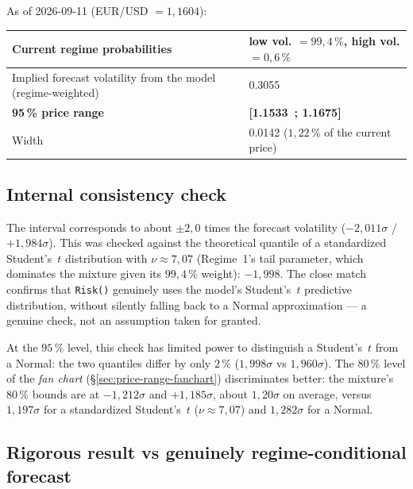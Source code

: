 \documentclass[12pt,a4paper]{article}
\begin{document}
As of 2026-09-11 (EUR/USD $=1{,}1604$):

\vspace{0.3cm}

\begin{center}
	\begin{tabular}{|p{6.7cm}|p{6.7cm}|}
		\hline
		Current regime probabilities & low vol. $=99{,}4\,\%$, high vol. $=0{,}6\,\%$ \\
		\hline
		Implied forecast volatility from the model (regime-weighted) & 0.3055 \\
		\hline
		\textbf{95\,\% price range} & \textbf{[1.1533~; 1.1675]} \\
		\hline
		Width & 0.0142 ($1{,}22\,\%$ of the current price) \\
		\hline
	\end{tabular}
\end{center}

\vspace{0.3cm}

\subsection{Internal consistency check}
\label{sec:price-range-internal-check}

The interval corresponds to about $\pm 2{,}0$ times the
forecast volatility ($-2{,}011\sigma$ / $+1{,}984\sigma$). This was checked against
the theoretical quantile of a standardized Student's~$t$
distribution with $\nu \approx 7{,}07$ (Regime~1's tail
parameter, which dominates the mixture given its $99{,}4\,\%$
weight): $-1{,}998$. The close match confirms that
\texttt{Risk()} genuinely uses the model's Student's~$t$
predictive distribution, without silently falling back to a
Normal approximation --- a genuine check, not an
assumption taken for granted.

At the $95\,\%$ level, this check has limited power to
distinguish a Student's~$t$ from a Normal: the two quantiles
differ by only $2\,\%$ ($1{,}998\sigma$ vs $1{,}960\sigma$). The
$80\,\%$ level of the \emph{fan chart} (\S\ref{sec:price-range-fanchart})
discriminates better: the mixture's $80\,\%$ bounds are at
$-1{,}212\sigma$ and $+1{,}185\sigma$, about $1{,}20\sigma$ on
average, versus $1{,}197\sigma$ for a standardized
Student's~$t$ ($\nu \approx 7{,}07$) and $1{,}282\sigma$ for a Normal.

\newpage

\subsection{Rigorous result vs genuinely regime-conditional forecast}
\end{document}
